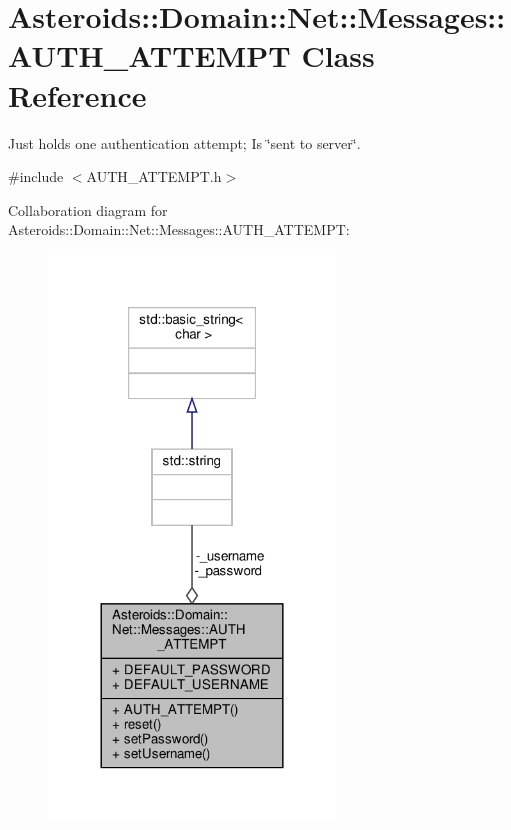 \hypertarget{classAsteroids_1_1Domain_1_1Net_1_1Messages_1_1AUTH__ATTEMPT}{}\section{Asteroids\+:\+:Domain\+:\+:Net\+:\+:Messages\+:\+:A\+U\+T\+H\+\_\+\+A\+T\+T\+E\+M\+PT Class Reference}
\label{classAsteroids_1_1Domain_1_1Net_1_1Messages_1_1AUTH__ATTEMPT}


Just holds one authentication attempt; Is \char`\"{}sent to server\char`\"{}.  




{\ttfamily \#include $<$A\+U\+T\+H\+\_\+\+A\+T\+T\+E\+M\+P\+T.\+h$>$}



Collaboration diagram for Asteroids\+:\+:Domain\+:\+:Net\+:\+:Messages\+:\+:A\+U\+T\+H\+\_\+\+A\+T\+T\+E\+M\+PT\+:\nopagebreak
\begin{figure}[H]
\begin{center}
\leavevmode
\includegraphics[width=216pt]{classAsteroids_1_1Domain_1_1Net_1_1Messages_1_1AUTH__ATTEMPT__coll__graph}
\end{center}
\end{figure}
